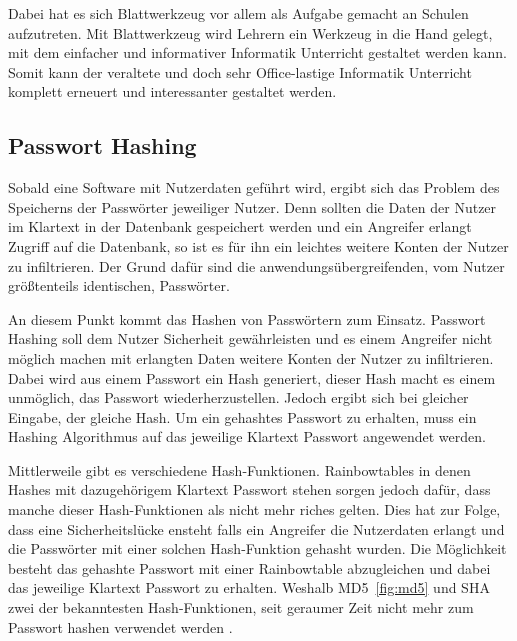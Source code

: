 \documentclass[paper=a4,fontsize=12pt,parskip=half]{scrartcl}
\begin{document}
	Dabei hat es sich Blattwerkzeug vor allem als Aufgabe gemacht an Schulen aufzutreten. Mit Blattwerkzeug wird Lehrern ein Werkzeug in die Hand gelegt, mit dem einfacher und informativer Informatik Unterricht gestaltet werden kann. Somit kann der veraltete und doch sehr Office-lastige Informatik Unterricht komplett erneuert und interessanter gestaltet werden.

	\subsection{Passwort Hashing}
	\label{sec:password_hashing}

	Sobald eine Software mit Nutzerdaten geführt wird, ergibt sich das Problem des Speicherns der Passwörter jeweiliger Nutzer.
	Denn sollten die Daten der Nutzer im Klartext in der Datenbank gespeichert werden und ein Angreifer erlangt Zugriff auf die Datenbank, so ist es für ihn ein leichtes weitere Konten der Nutzer zu infiltrieren. Der Grund dafür sind die anwendungsübergreifenden, vom Nutzer größtenteils identischen, Passwörter.


	An diesem Punkt kommt das Hashen von Passwörtern zum Einsatz. Passwort Hashing soll dem Nutzer Sicherheit gewährleisten und es einem Angreifer nicht möglich machen mit erlangten Daten weitere Konten der Nutzer zu infiltrieren. Dabei wird aus einem Passwort ein Hash generiert, dieser Hash macht es einem unmöglich, das Passwort wiederherzustellen. Jedoch ergibt sich bei gleicher Eingabe, der gleiche Hash. Um ein gehashtes Passwort zu erhalten, muss ein Hashing Algorithmus auf das jeweilige Klartext Passwort angewendet werden.

	Mittlerweile gibt es verschiedene Hash-Funktionen. Rainbowtables in denen Hashes mit dazugehörigem Klartext Passwort stehen sorgen jedoch dafür, dass manche dieser Hash-Funktionen als nicht mehr riches gelten. Dies hat zur Folge, dass eine Sicherheitslücke ensteht falls ein Angreifer die Nutzerdaten erlangt und die Passwörter mit einer solchen Hash-Funktion gehasht wurden. Die Möglichkeit besteht das gehashte Passwort mit einer Rainbowtable abzugleichen und dabei das jeweilige Klartext Passwort zu erhalten. Weshalb MD5~\ref{fig:md5} und SHA zwei der bekanntesten Hash-Funktionen, seit geraumer Zeit nicht mehr zum Passwort hashen verwendet werden .
\end{document}
